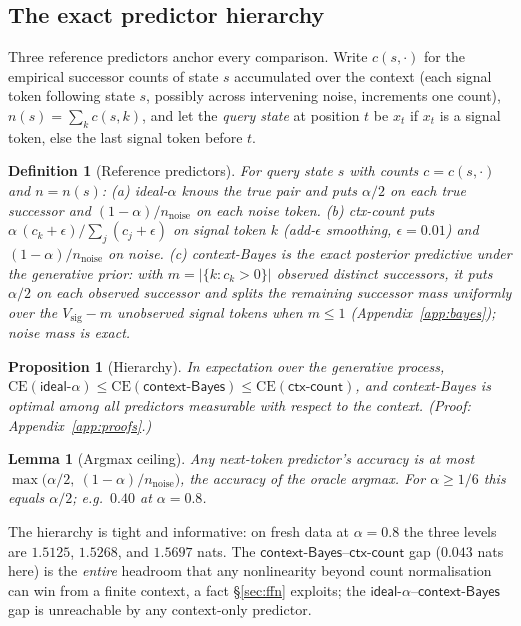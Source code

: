 \documentclass{article} %
\newtheorem{proposition}{Proposition}
\newtheorem{lemma}{Lemma}
\newtheorem{definition}{Definition}
\newcommand{\ctxcount}{\textsf{ctx-count}}
\newcommand{\ctxbayes}{\textsf{context-Bayes}}
\newcommand{\idealalpha}{\textsf{ideal-$\alpha$}}
\newcommand{\Vsig}{V_{\mathrm{sig}}}
\newcommand{\nnoise}{n_{\mathrm{noise}}}
\begin{document}
\subsection{The exact predictor hierarchy}
\label{sec:hierarchy}

Three reference predictors anchor every comparison. Write $c(s,\cdot)$ for the
empirical successor counts of state $s$ accumulated over the context (each signal
token following state $s$, possibly across intervening noise, increments one count),
$n(s)=\sum_k c(s,k)$, and let the \emph{query state} at position $t$ be $x_t$ if
$x_t$ is a signal token, else the last signal token before $t$.

\begin{definition}[Reference predictors]\label{def:refs}
For query state $s$ with counts $c=c(s,\cdot)$ and $n=n(s)$:
\emph{(a)} \idealalpha{} knows the true pair and puts $\alpha/2$ on each true
successor and $(1-\alpha)/\nnoise$ on each noise token.
\emph{(b)} \ctxcount{} puts $\alpha\,(c_k+\epsilon)/\sum_j(c_j+\epsilon)$ on signal
token $k$ (add-$\epsilon$ smoothing, $\epsilon=0.01$) and $(1-\alpha)/\nnoise$ on
noise.
\emph{(c)} \ctxbayes{} is the exact posterior predictive under the generative prior:
with $m=|\{k: c_k>0\}|$ observed distinct successors, it puts $\alpha/2$ on each
observed successor and splits the remaining successor mass uniformly over the
$\Vsig-m$ unobserved signal tokens when $m\le 1$ (Appendix~\ref{app:bayes}); noise
mass is exact.
\end{definition}

\begin{proposition}[Hierarchy]\label{prop:hierarchy}
In expectation over the generative process,
$\mathrm{CE}(\idealalpha) \le \mathrm{CE}(\ctxbayes) \le \mathrm{CE}(\ctxcount)$,
and \ctxbayes{} is optimal among all predictors measurable with respect to the
context. (Proof: Appendix~\ref{app:proofs}.)
\end{proposition}

\begin{lemma}[Argmax ceiling]\label{lem:ceiling}
Any next-token predictor's accuracy is at most
$\max\!\big(\alpha/2,\ (1-\alpha)/\nnoise\big)$, the accuracy of the oracle argmax.
For $\alpha\ge 1/6$ this equals $\alpha/2$; e.g.\ $0.40$ at $\alpha=0.8$.
\end{lemma}

The hierarchy is tight and informative: on fresh data at $\alpha=0.8$ the three
levels are $1.5125$, $1.5268$, and $1.5697$ nats. The $\ctxbayes$--$\ctxcount$ gap
($0.043$ nats here) is the \emph{entire} headroom that any nonlinearity beyond count
normalisation can win from a finite context, a fact \S\ref{sec:ffn} exploits; the
$\idealalpha$--$\ctxbayes$ gap is unreachable by any context-only predictor.
\end{document}
